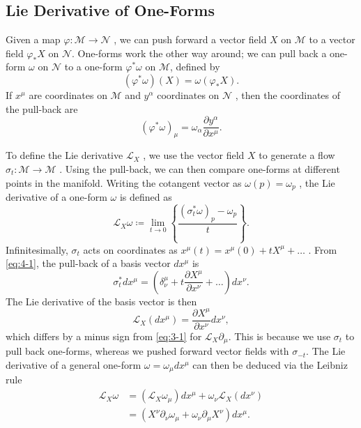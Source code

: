 \subsection{Lie Derivative of One-Forms}%
\label{sub:lie_derivative_of_one_forms}

Given a map $\varphi\colon \mathcal{M} \to \mathcal{N}$ , we can push forward a vector field $X$  on $\mathcal{M}$  to a vector field $\varphi_* X$  on $\mathcal{N}$.
One-forms work the other way around; we can pull back a one-form $\omega$ on $\mathcal{N}$ to a one-form $\varphi^* \omega$ on $\mathcal{M}$, defined by
\begin{equation}
  \label{eq:4-1}
  (\varphi^* \omega) (X) = \omega (\varphi_* X).
\end{equation}
If $x^{\mu}$  are coordinates on $\mathcal{M}$ and  $y^{\alpha}$  coordinates on $\mathcal{N}$ , then the coordinates of the pull-back are
\begin{equation}
  (\varphi^* \omega)_{\mu} = \omega_{\alpha} \frac{\partial y^{\alpha}}{\partial x^{\mu}}.
\end{equation}

To define the Lie derivative $\mathcal{L}_X$ , we use the vector field $X$  to generate a flow $\sigma_t \colon \mathcal{M} \to \mathcal{M}$ . Using the pull-back, we can then compare one-forms at different points in the manifold. Writing the cotangent vector as $\omega(p) = \omega_p$ , the Lie derivative of a one-form $\omega$  is defined as
\begin{equation}
  \mathcal{L}_X \omega \coloneqq \lim_{t \to 0} \left\{ \frac{(\sigma^*_t \omega)_p - \omega_p}{t} \right\}.
\end{equation}
Infinitesimally, $\sigma_t$  acts on coordinates as $x^{\mu}(t) = x^{\mu}(0) + t X^{\mu} + \dots$ .
From \eqref{eq:4-1}, the pull-back of a basis vector $dx^{\mu}$  is
\begin{equation}
  \sigma_t^* dx^{\mu} = \left( \delta^{\mu}_{\nu} + t \frac{\partial X^{\mu}}{\partial x^{\nu}} + \dots \right) dx^{\nu}.
\end{equation}
The Lie derivative of the basis vector is then
\begin{equation}
  \mathcal{L}_X (dx^{\mu}) = \frac{\partial X^{\mu}}{\partial x^{\nu}} dx^{\nu},
\end{equation}
which differs by a minus sign from \eqref{eq:3-1} for $\mathcal{L}_X \partial_{\mu}$.
This is because we use $\sigma_t$ to pull back one-forms, whereas we pushed forward vector fields with $\sigma_{-t}$.
The Lie derivative of a general one-form $\omega = \omega_{\mu} dx^{\mu}$ can then be deduced via the Leibniz rule
\begin{align}
  \mathcal{L}_X \omega &= (\mathcal{L}_X \omega_{\mu}) dx^{\mu} + \omega_{\nu} \mathcal{L}_X(dx^{\nu}) \\
		       &= (X^{\nu} \partial_{\nu} \omega_{\mu} + \omega_{\nu} \partial_{\mu} X^{\nu}) dx^{\mu}.
\end{align}

